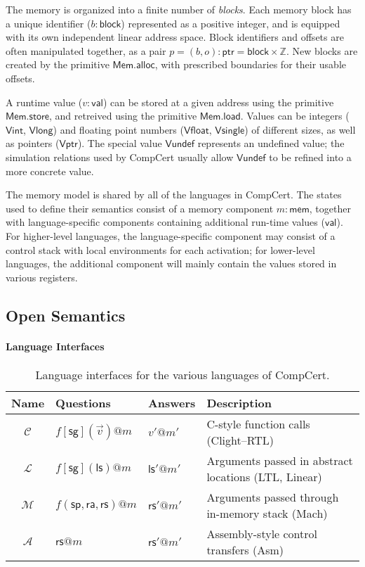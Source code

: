 \documentclass[sigplan,10pt,review,anonymous]{acmart}
\newcommand{\kw}[1]{\ensuremath{ \mathsf{#1} }}
\begin{document}
The memory is organized into a finite number of \emph{blocks}.
Each memory block has a unique identifier ($b : \kw{block}$)
represented as a positive integer,
and is equipped with its own independent linear address space.
Block identifiers and offsets are often manipulated together,
as a pair $p = (b, o) : \kw{ptr} = \kw{block} \times \mathbb{Z}$.
New blocks are created by the primitive $\kw{Mem.alloc}$,
with prescribed boundaries for their usable offsets.

A runtime value ($v : \kw{val}$) can be stored at
a given address using the primitive \kw{Mem.store},
and retreived using the primitive \kw{Mem.load}.
Values can be integers (\kw{Vint}, \kw{Vlong}) and
floating point numbers (\kw{Vfloat}, \kw{Vsingle})
of different sizes,
as well as pointers (\kw{Vptr}).
The special value \kw{Vundef}
represents an undefined value;
the simulation relations used by CompCert
usually allow $\kw{Vundef}$
to be refined into a more concrete value.

The memory model is shared by all of the languages in CompCert.
The states used to define their semantics consist of
a memory component $m : \kw{mem}$,
together with language-specific components
containing additional run-time values ($\kw{val}$).
For higher-level languages,
the language-specific component may consist of
a control stack with local environments for each activation;
for lower-level languages,
the additional component will mainly contain
the values stored in various registers.


\subsection{Open Semantics} \label{sec:sem:open} %

\paragraph{Language Interfaces} %

\begin{table*} %
  \begin{tabular}{clll}
    \hline
    Name & Questions & Answers & Description \\
    \hline
    $\mathcal{C}$ & $f[\kw{sg}](\vec{v})@m$ & $v'@m'$ &
      C-style function calls (Clight--RTL) \\
    $\mathcal{L}$ & $f[\kw{sg}](\kw{ls})@m$ & $\kw{ls}'@m'$ &
      Arguments passed in abstract locations (LTL, Linear) \\
    $\mathcal{M}$ & $f(\kw{sp},\kw{ra},\kw{rs})@m$ & $\kw{rs}'@m'$ &
      Arguments passed through in-memory stack (Mach) \\
    $\mathcal{A}$ & $\kw{rs}@m$ & $\kw{rs}'@m'$ &
      Assembly-style control transfers (Asm) \\
    \hline
  \end{tabular}
  \caption{Language interfaces for the various languages of CompCert.}
  \label{tbl:li}
\end{table*}
\end{document}
